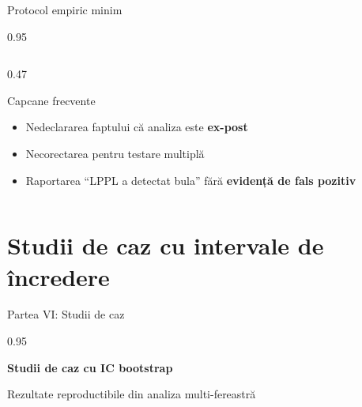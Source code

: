 \documentclass[9pt, aspectratio=169, t]{beamer}
\begin{document}
\begin{frame}{Protocol empiric minim}
\begin{cminipage}{0.95\textwidth}
{\begin{columns}[T]
\begin{column}{0.47\textwidth}
\begin{alertblock}{Capcane frecvente}
\begin{itemize}
                    \item Nedeclararea faptului că analiza este \textbf{ex-post}
                    \item Necorectarea pentru testare multiplă
                    \item Raportarea ``LPPL a detectat bula'' fără \textbf{evidență de fals pozitiv}
                \end{itemize}
            \end{alertblock}
        \end{column}
    \end{columns}
    }
    \end{cminipage}
\end{frame}

\section{Studii de caz cu intervale de încredere}

\begin{frame}{Partea VI: Studii de caz}
    \begin{cminipage}{0.95\textwidth}
    \begin{center}
        {\LARGE\color{MainBlue}\textbf{Studii de caz cu IC bootstrap}}

        \vspace{8mm}
        {\large Rezultate reproductibile din analiza multi-fereastră}
    \end{center}
    \end{cminipage}
\end{frame}
\end{document}
